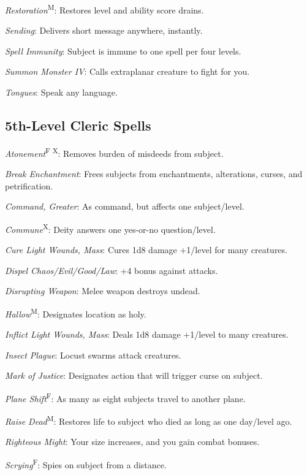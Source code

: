\textit{Restoration}\textsuperscript{M}: Restores level and ability score drains.

\textit{Sending}: Delivers short message anywhere, instantly.

\textit{Spell Immunity}: Subject is immune to one spell per four levels.

\textit{Summon Monster IV}: Calls extraplanar creature to fight for you.

\textit{Tongues}: Speak any language.



\subsection{5th-Level Cleric Spells}

\textit{Atonement}\textsuperscript{F X}: Removes burden of misdeeds from subject.

\textit{Break Enchantment}: Frees subjects from enchantments, alterations, curses, and petrification.

\textit{Command, Greater}: As command, but affects one subject/level.

\textit{Commune}\textsuperscript{X}: Deity answers one yes-or-no question/level.

\textit{Cure Light Wounds, Mass}: Cures 1d8 damage +1/level for many creatures.

\textit{Dispel Chaos/Evil/Good/Law}: +4 bonus against attacks.

\textit{Disrupting Weapon}: Melee weapon destroys undead.


\textit{Hallow}\textsuperscript{M}: Designates location as holy.

\textit{Inflict Light Wounds, Mass}: Deals 1d8 damage +1/level to many creatures.

\textit{Insect Plague}: Locust swarms attack creatures.

\textit{Mark of Justice}: Designates action that will trigger curse on subject.

\textit{Plane Shift}\textsuperscript{F}: As many as eight subjects travel to another plane.

\textit{Raise Dead}\textsuperscript{M}: Restores life to subject who died as long as one day/level ago.

\textit{Righteous Might}: Your size increases, and you gain combat bonuses.

\textit{Scrying}\textsuperscript{F}: Spies on subject from a distance.

